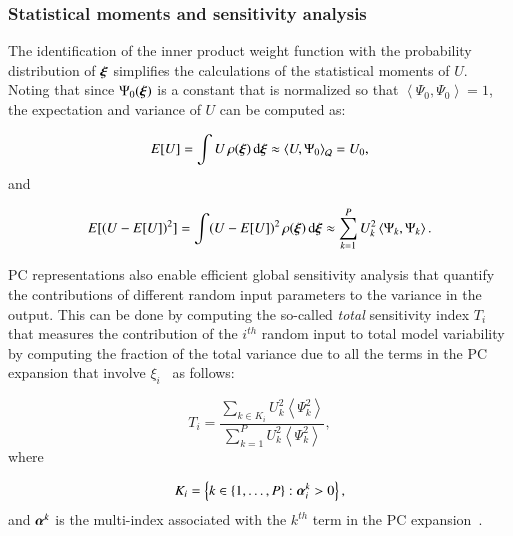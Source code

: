 \documentclass[review,12pt]{elsarticle}
\newcommand{\xxi}{\vec{\xi}}
\newcommand{\ave}[1]{\left\langle {#1} \right\rangle}
\renewcommand{\vec}[1]{{\mathchoice
                     {\mbox{\boldmath$\displaystyle{#1}$}}
                     {\mbox{\boldmath$\textstyle{#1}$}}
                     {\mbox{\boldmath$\scriptstyle{#1}$}}
                     {\mbox{\boldmath$\scriptscriptstyle{#1}$}}}}
\begin{document}
\subsubsection{Statistical moments and sensitivity analysis}
The identification of the inner product weight function
with the probability distribution of $\xxi$ simplifies the calculations of the statistical moments of $U$. 
Noting that since $\Psi_0(\xxi)$ is a constant that is normalized so that 
$\left<\Psi_0,\Psi_0\right>=1$, the expectation and variance of $U$ can be computed as:

\begin{equation}
 E[U] = \int U \, \rho(\xxi) \, \mbox{d}\xxi \approx \left< U,\Psi_0\right>_{\cal Q} = U_0,  
 \label{eq:mean}
\end{equation}
and 

\begin{equation}
 E[(U-E[U])^2] = \int (U-E[U])^2 \, \rho(\xxi) \, \mbox{d}\xxi \approx \sum_{k=1}^P U_k^2
 \label{eq:sigma}
\left<\Psi_k,\Psi_k\right>.
\end{equation}

PC representations also enable
efficient global sensitivity analysis that quantify the
contributions of different random input parameters to the variance in the output.
This can be done by computing the so-called {\it total} 
sensitivity index $T_i$ that measures the contribution of
the $i^{th}$ random input to total model variability by
computing the fraction of the total variance due to all the terms in the
PC expansion that involve $\xi_i$~\citep{LeMaitreKnio2010,Crestaux,Sudret}
as follows:

%

\begin{equation} \label{eq:T-hard}
   T_i =
         \frac{\displaystyle
               \sum_{k \in K_i} U_k^2 \ave{\Psi_k^2}}
              {\displaystyle\sum_{k = 1}^P U_k^2 \ave{\Psi_k^2}},
\end{equation}
where 

\[
   K_i = \left\{ k \in \{1, \ldots, P\} :
           \vec{\alpha}^k_i > 0 \right\},
        \]
and $\vec{\alpha}^k$ is the multi-index associated with the $k^{th}$ term in the
PC expansion~\cite{LeMaitreKnio2010}.

\end{document}
